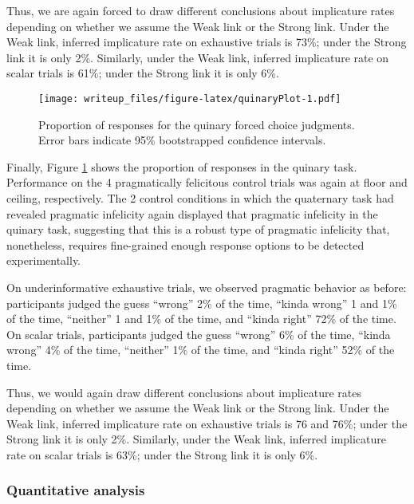 \documentclass[man]{apa6}
\theoremstyle{definition}
\theoremstyle{definition}
\theoremstyle{definition}
\theoremstyle{remark}
\begin{document}
Thus, we are again forced to draw different conclusions about
implicature rates depending on whether we assume the Weak link or the
Strong link. Under the Weak link, inferred implicature rate on
exhaustive trials is 73\%; under the Strong link it is only 2\%.
Similarly, under the Weak link, inferred implicature rate on scalar
trials is 61\%; under the Strong link it is only 6\%.

\begin{figure}
\centering
\texttt{[image: writeup\_files/figure-latex/quinaryPlot-1.pdf]}
\caption{\label{fig:quinaryPlot}Proportion of responses for the quinary
forced choice judgments. Error bars indicate 95\% bootstrapped
confidence intervals.}
\end{figure}

Finally, Figure \ref{fig:quinaryPlot} shows the proportion of responses
in the quinary task. Performance on the 4 pragmatically felicitous
control trials was again at floor and ceiling, respectively. The 2
control conditions in which the quaternary task had revealed pragmatic
infelicity again displayed that pragmatic infelicity in the quinary
task, suggesting that this is a robust type of pragmatic infelicity
that, nonetheless, requires fine-grained enough response options to be
detected experimentally.

On underinformative exhaustive trials, we observed pragmatic behavior as
before: participants judged the guess \enquote{wrong} 2\% of the time,
\enquote{kinda wrong} 1 and 1\% of the time, \enquote{neither} 1 and 1\%
of the time, and \enquote{kinda right} 72\% of the time. On scalar
trials, participants judged the guess \enquote{wrong} 6\% of the time,
\enquote{kinda wrong} 4\% of the time, \enquote{neither} 1\% of the
time, and \enquote{kinda right} 52\% of the time.

Thus, we would again draw different conclusions about implicature rates
depending on whether we assume the Weak link or the Strong link. Under
the Weak link, inferred implicature rate on exhaustive trials is 76 and
76\%; under the Strong link it is only 2\%. Similarly, under the Weak
link, inferred implicature rate on scalar trials is 63\%; under the
Strong link it is only 6\%.

\subsubsection{Quantitative analysis}\label{quantitative-analysis}
\end{document}

